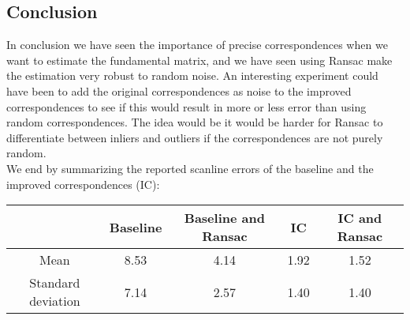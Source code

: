 \subsection{Conclusion}
In conclusion we have seen the importance of precise correspondences when we want to estimate the fundamental matrix, and we have seen using Ransac make the estimation very robust to random noise. An interesting experiment could have been to add the original correspondences as noise to the improved correspondences to see if this would result in more or less error than using random correspondences. The idea would be it would be harder for Ransac to differentiate between inliers and outliers if the correspondences are not purely random.\\
We end by summarizing the reported scanline errors of the baseline and the improved correspondences (IC):
\begin{table}[h]
	\centering
	\begin{tabular}{|c|c|c|c|c|}\hline
									 &Baseline & Baseline and Ransac & IC 		&IC and Ransac\\\hline
		Mean					 &8.53	    & 4.14							& 1.92	 &1.52				  \\\hline
		Standard deviation&7.14		  & 2.57						  &1.40	   &1.40		        \\\hline
	\end{tabular}
\end{table}
